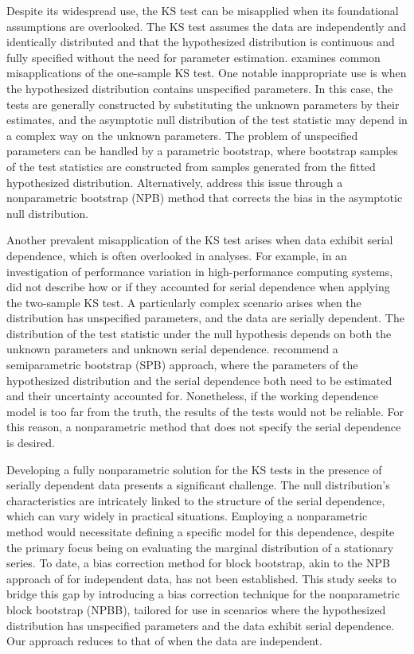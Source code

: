\documentclass[APA,Times1COL]{WileyNJDv5} %
\begin{document}
Despite its widespread use, the KS test can be 
misapplied when its foundational assumptions are overlooked. The KS test 
assumes the data are independently and identically distributed and 
that the hypothesized distribution is continuous and fully specified without 
the need for parameter estimation. \citet{zeimbekakis2022misuses} examines
common misapplications of the one-sample KS test. One notable inappropriate
use is when the hypothesized distribution contains unspecified parameters.
In this case, the tests are generally constructed by substituting the unknown
parameters by their estimates, and the asymptotic null distribution of
the test statistic may depend in a complex way on the unknown parameters.
The problem of unspecified parameters can be handled by a parametric
bootstrap, where bootstrap samples of the test statistics are constructed from
samples generated from the fitted hypothesized distribution.
Alternatively, \citet{babu2004goodness} address this issue through a
nonparametric bootstrap (NPB) method that corrects the bias in the asymptotic null
distribution.



Another prevalent misapplication of the KS test arises when data exhibit serial
dependence, which is often overlooked in analyses. For example, in an
investigation of performance variation in high-performance computing systems,
\citet{tuncer2019ieee} did not describe how or if they accounted for serial
dependence when applying the two-sample KS test.
A particularly complex scenario arises when the distribution has unspecified
parameters, and the data are serially dependent.
The distribution of the test statistic under the null hypothesis depends on both
the unknown parameters and unknown serial dependence. 
\citet{zeimbekakis2022misuses} recommend a semiparametric bootstrap (SPB)
approach, where the parameters of the hypothesized distribution and the serial
dependence both need to be estimated and their uncertainty accounted for.
Nonetheless, if the working dependence model is too far from the truth, the
results of the tests would not be reliable. For this reason, a nonparametric
method that does not specify the serial dependence is desired.


Developing a fully nonparametric solution for the KS 
tests in the presence of serially dependent data presents a significant 
challenge. The null distribution's characteristics are intricately linked to 
the structure of the serial dependence, which can vary widely in practical 
situations. Employing a nonparametric method would necessitate defining a 
specific model for this dependence, despite the primary focus being on 
evaluating the marginal distribution of a stationary series. To date, a bias 
correction method for block bootstrap, akin to the NPB
approach of \citet{babu2004goodness} for independent data,
has not been established. This study seeks 
to bridge this gap by introducing a bias correction technique for the 
nonparametric block bootstrap (NPBB), tailored for use in scenarios where the 
hypothesized distribution has unspecified parameters and the data 
exhibit serial dependence. Our approach reduces to that of
\citet{babu2004goodness} when the data are independent. 
\end{document}

